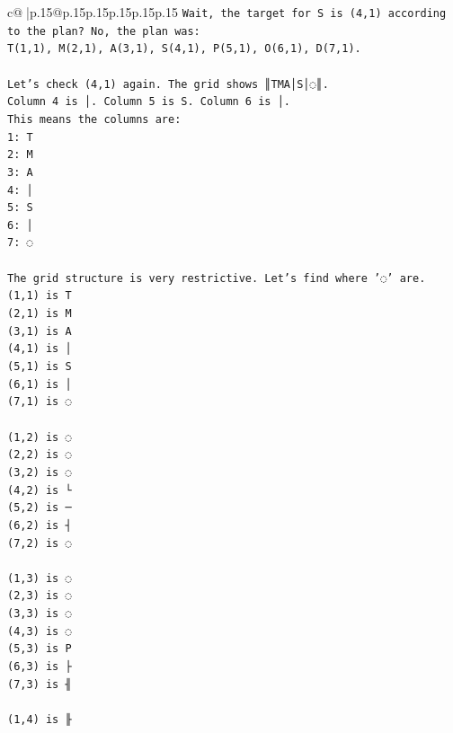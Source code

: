 \documentclass{article}
\begin{document}
{\begin{supertabular}{c@{$\;$}|p{.15\linewidth}@{}p{.15\linewidth}p{.15\linewidth}p{.15\linewidth}p{.15\linewidth}p{.15\linewidth}}
{{{\texttt{Wait, the target for S is (4,1) according to the plan? No, the plan was:} \\
\texttt{T(1,1), M(2,1), A(3,1), S(4,1), P(5,1), O(6,1), D(7,1).} \\
\\ 
\texttt{Let's check (4,1) again. The grid shows ║TMA│S│◌║.} \\
\texttt{Column 4 is │. Column 5 is S. Column 6 is │.} \\
\texttt{This means the columns are:} \\
\texttt{1: T} \\
\texttt{2: M} \\
\texttt{3: A} \\
\texttt{4: │} \\
\texttt{5: S} \\
\texttt{6: │} \\
\texttt{7: ◌} \\
\\ 
\texttt{The grid structure is very restrictive. Let's find where '◌' are.} \\
\texttt{(1,1) is T} \\
\texttt{(2,1) is M} \\
\texttt{(3,1) is A} \\
\texttt{(4,1) is │} \\
\texttt{(5,1) is S} \\
\texttt{(6,1) is │} \\
\texttt{(7,1) is ◌} \\
\\ 
\texttt{(1,2) is ◌} \\
\texttt{(2,2) is ◌} \\
\texttt{(3,2) is ◌} \\
\texttt{(4,2) is └} \\
\texttt{(5,2) is ─} \\
\texttt{(6,2) is ┤} \\
\texttt{(7,2) is ◌} \\
\\ 
\texttt{(1,3) is ◌} \\
\texttt{(2,3) is ◌} \\
\texttt{(3,3) is ◌} \\
\texttt{(4,3) is ◌} \\
\texttt{(5,3) is P} \\
\texttt{(6,3) is ├} \\
\texttt{(7,3) is ╢} \\
\\ 
\texttt{(1,4) is ╟} \\
}}}
\end{supertabular}}
\end{document}
